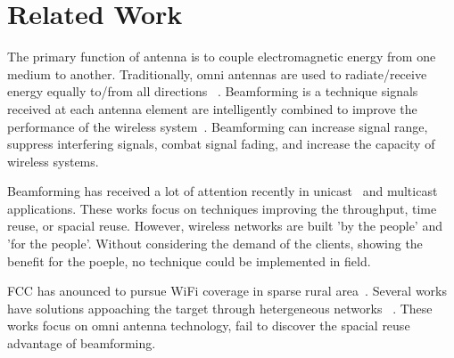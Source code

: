\section{Related Work}
\label{sec:related}

The primary function of antenna is to couple electromagnetic energy from one medium to another. 
Traditionally, omni antennas are used to radiate/receive energy equally to/from all directions
~\cite{bazan2012survey}.
Beamforming is a technique signals received at each antenna element are intelligently 
combined to improve the performance of the wireless system~\cite{winters2006smart}. 
Beamforming can increase signal range, suppress interfering signals, combat signal 
fading, and increase the capacity of wireless systems. 

Beamforming has received a lot of attention recently in unicast~\cite{navda2007mobisteer} 
and multicast~\cite{sidiropoulos2006transmit,aryafar2013adam} applications.
These works focus on techniques improving the throughput, time reuse, or spacial
reuse. 
However, wireless networks are built 'by the people' and 'for the people'. Without
considering the demand of the clients, showing the benefit for the poeple, no technique
could be implemented in field.

FCC has anounced to pursue WiFi coverage in sparse rural area~\cite{fccwhitespace}.
Several works have solutions appoaching the target through hetergeneous networks
~\cite{pcuiwinmee,wu2007delaunay}. These works focus on omni antenna technology, fail to 
discover the spacial reuse advantage of beamforming.

